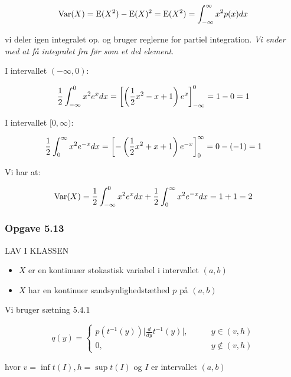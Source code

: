 \begin{equation}
    \text{Var}(X) = \text{E}(X^2) - \text{E}(X)^2 = \text{E}(X^2) =  \int_{-\infty}^{\infty} x^2 p(x) dx
\end{equation}

vi deler igen integralet op. og bruger reglerne for partiel integration. \textit{Vi ender med at få integralet fra før som et del element}.

I intervallet $(-\infty, 0)$:

\begin{equation}
    \frac{1}{2}\int_{-\infty}^{0}  x^2 e^x dx =  \left[ \left( \frac{1}{2}x^2 - x + 1\right) e^{x} \right]_{-\infty}^{0} = 1 - 0 = 1
\end{equation}

I intervallet $[0, \infty)$:

\begin{equation}
    \frac{1}{2} \int_{0}^{\infty}  x^2 e^{-x} dx = \left[ - \left( \frac{1}{2} x^2 + x + 1\right) e^{-x}\right]_{0}^{\infty} = 0 - (-1) = 1
\end{equation}

Vi har at:

\begin{equation}
    \text{Var}(X) = \frac{1}{2}\int_{-\infty}^{0}  x^2 e^x dx +  \frac{1}{2} \int_{0}^{\infty}  x^2 e^{-x} dx =  1 + 1 = 2
\end{equation}

\subsubsection{Opgave 5.13}

LAV I KLASSEN

\begin{itemize}
    \item $X$ er en kontinuær stokastisk variabel i intervallet $(a, b)$
    \item $X$ har en kontinuer sandsynlighedstæthed $p$ på $(a,b)$
\end{itemize}

Vi bruger sætning $5.4.1$

\begin{equation}
    q(y) = 
    \begin{cases}
        p(t^{-1}(y)) \lvert \frac{d}{dy} t^{-1}(y) \rvert , \qquad &y \in (v,h) \\
        0, \qquad &y \notin (v,h)
    \end{cases}
\end{equation}

hvor $v = \inf t(I), h = \sup t(I)$ og $I$ er intervallet $(a,b)$

